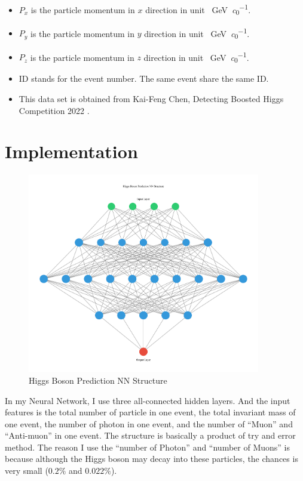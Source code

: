 \documentclass[a4paper,12pt, oneside]{article}
\begin{document}
\begin{itemize}
	\item $P_x$ is the particle momentum in $x$ direction in unit \SI{}{\GeV\per\clight}.
	\item $P_y$ is the particle momentum in $y$ direction in unit \SI{}{\GeV\per\clight}.
	\item $P_z$ is the particle momentum in $z$ direction in unit \SI{}{\GeV\per\clight}.
	\item ID stands for the event number. The same event share the same ID.
	\item This data set is obtained from Kai-Feng Chen, Detecting Boosted Higgs Competition 2022 \cite{ntuphys-cpintro-mlcomp-2022}.
\end{itemize}
\newpage
\section{Implementation}
\begin{figure}[H]
\centering
\includegraphics[width = 4in]{My_NN_Structure.pdf}
\caption{Higgs Boson Prediction NN Structure}\label{My_NN_Model}
\end{figure}

In my Neural Network, I use three all-connected hidden layers. And the input features is the total number of particle in one event, the total invariant mass of one event, the number of photon in one event, and the number of ``Muon'' and ``Anti-muon'' in one event. The structure is basically a product of try and error method. The reason I use the ``number of Photon'' and ``number of Muons'' is because although the Higgs boson may decay into these particles, the chances is very small ($0.2\%$ and $0.022\%$).
%
\newpage
%
\end{document}
